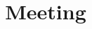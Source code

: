 

\title[\today]{Meeting}
\subtitle{}



\begin{frame}[plain,b]
    \titlepage
\end{frame}


\newcommand{\slidesdir}{.}



%     


